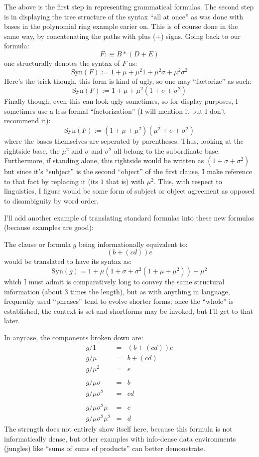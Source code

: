 \documentclass[twoside]{article}
\begin{document}
The above is the first step in representing grammatical formulas.  The second step is in displaying the tree structure of
the syntax ``all at once'' as was done with bases in the polynomial ring example earier on.  This is of course done in the
same way, by concatenating the paths with plus ($ + $) signs.  Going back to our formula:
$$ F:\equiv B*(D+E) $$
one structurally denotes the syntax of $ F $ as:
$$ \mbox{Syn}(F):=1+\mu+\mu^{2}1+\mu^2\sigma+\mu^2\sigma^2 $$
Here's the trick though, this form is kind of ugly, so one may ``factorize'' as such:
$$ \mbox{Syn}(F):=1+\mu+\mu^2(1+\sigma+\sigma^2) $$
Finally though, even this can look ugly sometimes, so for display purposes, I sometimes use a less formal ``factorization''
(I will mention it but I don't recommend it):
$$ \mbox{Syn}(F):=(1+\mu+\mu^2)(\mu^2+\sigma+\sigma^2) $$
where the bases themselves are seperated by parentheses.  Thus, looking at the rightside base, the $ \mu^2 $ and $ \sigma $
and $ \sigma^2 $ all belong to the subordinate base.  Furthermore, if standing alone, this rightside would be written as
$ (1+\sigma+\sigma^2) $ but since it's ``subject'' is the second ``object'' of the first clause, I make reference to that
fact by replacing it (its $ 1 $ that is) with $ \mu^2 $.  This, with respect to linguistics, I figure would be some form
of subject or object agreement as opposed to disambiguity by word order.

I'll add another example of translating standard formulas into these new formulas (because examples are good):

The clause or formula $ g $ being informationally equivalent to:
$$ (b+(cd))e $$
would be translated to have its syntax as:
$$ \mbox{Syn}(g)=1+\mu(1+\sigma+\sigma^2(1+\mu+\mu^2))+\mu^2 $$
which I must admit is comparatively long to convey the same structural information (about $ 3 $ times the length),
but as with anything in language, frequently used ``phrases'' tend to evolve shorter forms; once the ``whole'' is
established, the context is set and shortforms may be invoked, but I'll get to that later.

In anycase, the components broken down are:
\begin{eqnarray*}
g/1 & = & (b+(cd))e\\
g/\mu & = & b+(cd)\\
g/\mu^{2} & = & e\\
 &   & \\
g/\mu\sigma & = & b\\
g/\mu\sigma^2 & = & cd\\
 &   & \\
g/\mu\sigma^2\mu & = & c\\
g/\mu\sigma^2\mu^2 & = & d
\end{eqnarray*}
The strength does not entirely show itself here, because this formula is not informatically dense, but other examples
with info-dense data environments (jungles) like ``sums of sums of products'' can better demonstrate.
\end{document}
